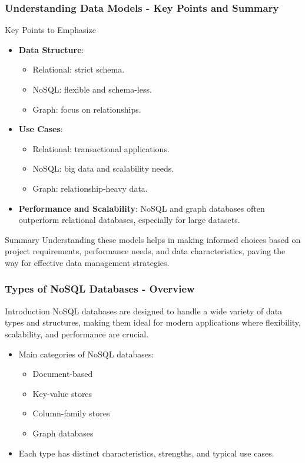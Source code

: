 \documentclass[aspectratio=169]{beamer}
\begin{document}
\begin{frame}[fragile]
    \frametitle{Understanding Data Models - Key Points and Summary}
    \begin{block}{Key Points to Emphasize}
        \begin{itemize}
            \item \textbf{Data Structure}:
                \begin{itemize}
                    \item Relational: strict schema.
                    \item NoSQL: flexible and schema-less.
                    \item Graph: focus on relationships.
                \end{itemize}
            \item \textbf{Use Cases}:
                \begin{itemize}
                    \item Relational: transactional applications.
                    \item NoSQL: big data and scalability needs.
                    \item Graph: relationship-heavy data.
                \end{itemize}
            \item \textbf{Performance and Scalability}: NoSQL and graph databases often outperform relational databases, especially for large datasets.
        \end{itemize}
    \end{block}

    \begin{block}{Summary}
        Understanding these models helps in making informed choices based on project requirements, performance needs, and data characteristics, paving the way for effective data management strategies.
    \end{block}
\end{frame}

\begin{frame}[fragile]
    \frametitle{Types of NoSQL Databases - Overview}
    \begin{block}{Introduction}
        NoSQL databases are designed to handle a wide variety of data types and structures, making them ideal for modern applications where flexibility, scalability, and performance are crucial.
    \end{block}
    \begin{itemize}
        \item Main categories of NoSQL databases:
        \begin{itemize}
            \item Document-based
            \item Key-value stores
            \item Column-family stores
            \item Graph databases
        \end{itemize}
        \item Each type has distinct characteristics, strengths, and typical use cases.
    \end{itemize}
\end{frame}
\end{document}
